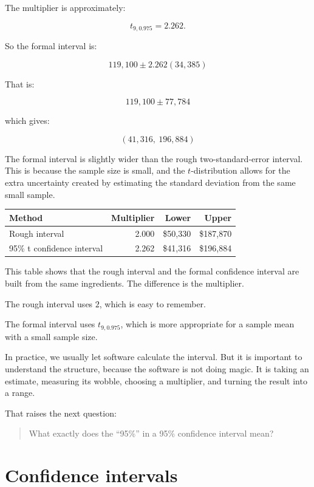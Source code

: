\documentclass[
  letterpaper,
  DIV=11,
  numbers=noendperiod]{scrreprt}
\begin{document}
The multiplier is approximately:

\[
t_{9,0.975} = 2.262.
\]

So the formal interval is:

\[
119{,}100 \pm 2.262(34{,}385)
\]

That is:

\[
119{,}100 \pm 77{,}784
\]

which gives:

\[
(41{,}316,\ 196{,}884)
\]

The formal interval is slightly wider than the rough two-standard-error
interval. This is because the sample size is small, and the
\(t\)-distribution allows for the extra uncertainty created by
estimating the standard deviation from the same small sample.

\begin{table}
\fontsize{12.0pt}{14.0pt}\selectfont
\begin{tabular*}{\linewidth}{@{\extracolsep{\fill}}lrrr}
\toprule
Method & Multiplier & Lower & Upper \\ 
\midrule\addlinespace[2.5pt]
Rough interval & 2.000 & \$50,330 & \$187,870 \\ 
95\% t confidence interval & 2.262 & \$41,316 & \$196,884 \\ 
\bottomrule
\end{tabular*}
\end{table}

This table shows that the rough interval and the formal confidence
interval are built from the same ingredients. The difference is the
multiplier.

The rough interval uses \(2\), which is easy to remember.

The formal interval uses \(t_{9,0.975}\), which is more appropriate for
a sample mean with a small sample size.

In practice, we usually let software calculate the interval. But it is
important to understand the structure, because the software is not doing
magic. It is taking an estimate, measuring its wobble, choosing a
multiplier, and turning the result into a range.

That raises the next question:

\begin{quote}
What exactly does the ``95\%'' in a 95\% confidence interval mean?
\end{quote}

\section{Confidence intervals}\label{confidence-intervals}
\end{document}
